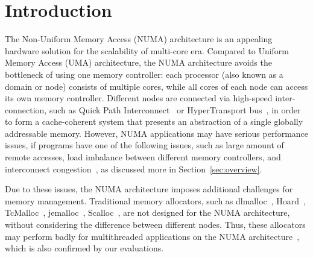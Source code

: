 
\section{Introduction}
\label{sec:intro}

The Non-Uniform Memory Access (NUMA) architecture is an appealing hardware solution for the scalability of multi-core era. Compared to Uniform Memory Access (UMA) architecture, the NUMA architecture avoids the bottleneck of using one memory controller: each processor (also known as a domain or node) consists of multiple cores, while all cores of each node can access its own memory controller. Different nodes are connected via high-speed inter-connection, such as Quick Path Interconnect~\cite{intelqpi} or HyperTransport bus~\cite{hypertransport}, in order to form a cache-coherent system that presents an abstraction of a single globally addressable memory. 
However, NUMA applications may have serious performance issues, if programs have one of the following issues, such as large amount of remote accesses, load imbalance between different memory controllers, and  interconnect congestion~\cite{Blagodurov:2011:CNC:2002181.2002182, Dashti:2013:TMH:2451116.2451157}, as discussed more in Section~\ref{sec:overview}. 

Due to these issues, the NUMA architecture imposes additional challenges for memory management. Traditional memory allocators, such as dlmalloc~\cite{dlmalloc},  Hoard~\cite{Hoard}, TcMalloc~\cite{tcmalloc}, jemalloc~\cite{jemalloc}, Scalloc~\cite{Scalloc}, are not designed for the NUMA architecture, without considering the difference between different nodes. Thus, these allocators may perform badly for multithreaded applications on the NUMA architecture~\cite{tcmallocnew, yang2019jarena}, which is also confirmed by our evaluations. 


